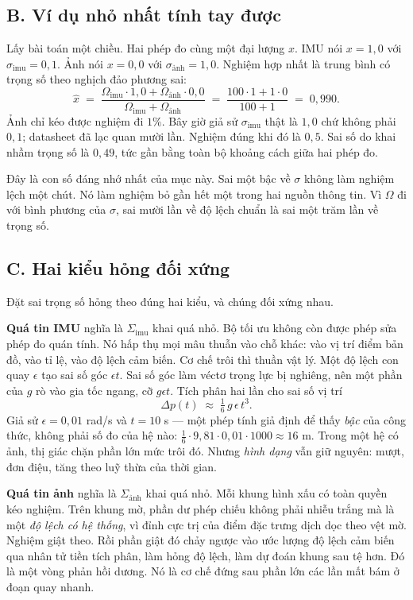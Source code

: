 \documentclass[../../deep_learning.tex]{subfiles}
\begin{document}
\subsection{B. Ví dụ nhỏ nhất tính tay được}

Lấy bài toán một chiều. Hai phép đo cùng một đại lượng \(x\). IMU nói \(x = 1{,}0\) với \(\sigma_{\text{imu}} = 0{,}1\). Ảnh nói \(x = 0{,}0\) với \(\sigma_{\text{ảnh}} = 1{,}0\). Nghiệm hợp nhất là trung bình có trọng số theo nghịch đảo phương sai:
\[
\hat{x} \;=\; \frac{\Omega_{\text{imu}}\cdot 1{,}0 + \Omega_{\text{ảnh}}\cdot 0{,}0}{\Omega_{\text{imu}}+\Omega_{\text{ảnh}}}
\;=\; \frac{100 \cdot 1 + 1 \cdot 0}{100 + 1} \;=\; 0{,}990 .
\]
Ảnh chỉ kéo được nghiệm đi \(1\%\). Bây giờ giả sử \(\sigma_{\text{imu}}\) thật là \(1{,}0\) chứ không phải \(0{,}1\); datasheet đã lạc quan mười lần. Nghiệm đúng khi đó là \(0{,}5\). Sai số do khai nhầm trọng số là \(0{,}49\), tức gần bằng toàn bộ khoảng cách giữa hai phép đo.

Đây là con số đáng nhớ nhất của mục này. Sai một bậc về \(\sigma\) không làm nghiệm lệch một chút. Nó làm nghiệm bỏ gần hết một trong hai nguồn thông tin. Vì \(\Omega\) đi với bình phương của \(\sigma\), sai mười lần về độ lệch chuẩn là sai một trăm lần về trọng số.

\subsection{C. Hai kiểu hỏng đối xứng}

Đặt sai trọng số hỏng theo đúng hai kiểu, và chúng đối xứng nhau.

\textbf{Quá tin IMU} nghĩa là \(\Sigma_{\text{imu}}\) khai quá nhỏ. Bộ tối ưu không còn được phép sửa phép đo quán tính. Nó hấp thụ mọi mâu thuẫn vào chỗ khác: vào vị trí điểm bản đồ, vào tỉ lệ, vào độ lệch cảm biến. Cơ chế trôi thì thuần vật lý. Một độ lệch con quay \(\epsilon\) tạo sai số góc \(\epsilon t\). Sai số góc làm véctơ trọng lực bị nghiêng, nên một phần của \(g\) rò vào gia tốc ngang, cỡ \(g\epsilon t\). Tích phân hai lần cho sai số vị trí
\[
\Delta p(t) \;\approx\; \tfrac{1}{6}\,g\,\epsilon\,t^{3}.
\]
Giả sử \(\epsilon = 0{,}01\) rad/s và \(t = 10\) s --- một phép tính giả định để thấy \emph{bậc} của công thức, không phải số đo của hệ nào: \(\tfrac{1}{6}\cdot 9{,}81 \cdot 0{,}01\cdot 1000 \approx 16\) m. Trong một hệ có ảnh, thị giác chặn phần lớn mức trôi đó. Nhưng \emph{hình dạng} vẫn giữ nguyên: mượt, đơn điệu, tăng theo luỹ thừa của thời gian.

\textbf{Quá tin ảnh} nghĩa là \(\Sigma_{\text{ảnh}}\) khai quá nhỏ. Mỗi khung hình xấu có toàn quyền kéo nghiệm. Trên khung mờ, phần dư phép chiếu không phải nhiễu trắng mà là một \emph{độ lệch có hệ thống}, vì đỉnh cực trị của điểm đặc trưng dịch dọc theo vệt mờ. Nghiệm giật theo. Rồi phần giật đó chảy ngược vào ước lượng độ lệch cảm biến qua nhân tử tiền tích phân, làm hỏng độ lệch, làm dự đoán khung sau tệ hơn. Đó là một vòng phản hồi dương. Nó là cơ chế đứng sau phần lớn các lần mất bám ở đoạn quay nhanh.
\end{document}
